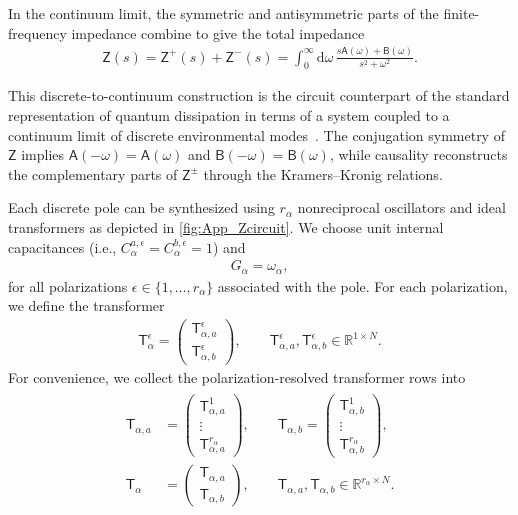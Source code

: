 \documentclass[prx,aps,twocolumn,article]{revtex4-2}
\newcommand{\msf}[1]{\mathsf{#1}}
\newcommand{\msT}{\msf{T}}
\newcommand{\msZ}{\msf{Z}}
\newcommand{\msA}{\msf{A}}
\newcommand{\msB}{\msf{B}}
\begin{document}
In the continuum limit, the symmetric and antisymmetric parts of the finite-frequency impedance combine to give the total impedance
\begin{align}
    \msZ(s)
    =
    \msZ^+(s)+\msZ^-(s)
    =
    \int_0^\infty
    \mathrm{d}\omega\,
    \frac{
        s\msA(\omega)+\msB(\omega)
    }{
        s^2+\omega^2
    }.
    \label{Eq:CauerContinuum}
\end{align}

This discrete-to-continuum construction is the circuit counterpart of the standard representation of quantum dissipation in terms of a system coupled to a continuum limit of discrete environmental modes~\cite{Senitzky:1960,Senitzky:1961,Feynman:1963,CaldeiraLeggett_QT:1983}.
The conjugation symmetry of $\msZ$ implies $\msA(-\omega)=\msA(\omega)$ and $\msB(-\omega)=\msB(\omega)$, while causality reconstructs the complementary parts of $\msZ^\pm$ through the Kramers--Kronig relations.


Each discrete pole can be synthesized using $r_\alpha$
nonreciprocal oscillators and ideal transformers as depicted in \cref{fig:App_Zcircuit}. We choose unit internal capacitances (i.e., $C_\alpha^{a,\epsilon}=C_\alpha^{b,\epsilon}=1$) and
\begin{align}
    G_\alpha
    =
    \omega_\alpha,
    \label{Eq:GaugeChoiceZ}
\end{align}
for all polarizations
$\epsilon\in\{1,\dots,r_\alpha\}$ associated with the pole.
For each polarization, we define the transformer
\begin{align}
    \msT_\alpha^\epsilon
    =
    \begin{pmatrix}
        \msT_{\alpha,a}^\epsilon\\
        \msT_{\alpha,b}^\epsilon
    \end{pmatrix},
    \qquad
    \msT_{\alpha,a}^\epsilon,
    \msT_{\alpha,b}^\epsilon
    \in
    \mathbb{R}^{1\times N}.
    \label{Eq:DiscreteTransformerDefinition}
\end{align}
For convenience, we collect the polarization-resolved transformer
rows into
\begin{align}
\begin{aligned}
    \msT_{\alpha,a}
    &=
    \begin{pmatrix}
        \msT_{\alpha,a}^{1}\\
        \vdots\\
        \msT_{\alpha,a}^{r_\alpha}
    \end{pmatrix},
    \qquad
    \msT_{\alpha,b}
    =
    \begin{pmatrix}
        \msT_{\alpha,b}^{1}\\
        \vdots\\
        \msT_{\alpha,b}^{r_\alpha}
    \end{pmatrix},\\
    \msT_\alpha
    &=
    \begin{pmatrix}
        \msT_{\alpha,a}\\
        \msT_{\alpha,b}
    \end{pmatrix},
    \qquad
    \msT_{\alpha,a},\msT_{\alpha,b}
    \in
    \mathbb{R}^{r_\alpha\times N}.
\end{aligned}
\end{align}
\end{document}

